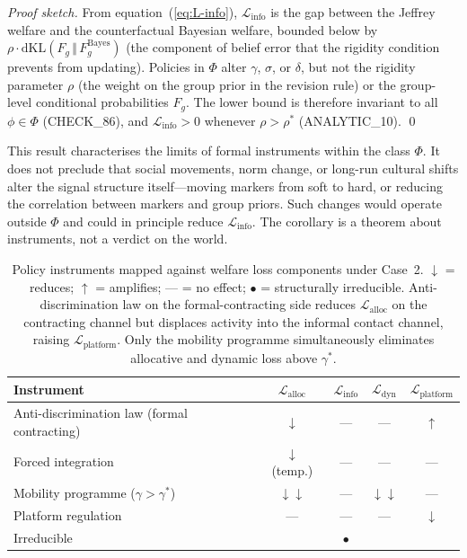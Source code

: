 \documentclass[12pt,a4paper]{article}
\theoremstyle{definition}
\numberwithin{proposition}{section}
\begin{document}
\begin{proof}[Proof sketch]
From equation~(\ref{eq:L-info}), $\mathcal{L}_{\text{info}}$ is the
gap between the Jeffrey welfare and the counterfactual Bayesian
welfare, bounded below by
$\rho \cdot \mathrm{dKL}(F_g \,\Vert\, F_g^{\mathrm{Bayes}})$ (the
component of belief error that the rigidity condition prevents
from updating). Policies in $\Phi$ alter $\gamma$, $\sigma$, or
$\delta$, but not the rigidity parameter $\rho$ (the weight on the
group prior in the revision rule) or the group-level conditional
probabilities $F_g$. The lower bound is therefore invariant to all
$\phi \in \Phi$ (CHECK\_86), and $\mathcal{L}_{\text{info}} > 0$
whenever $\rho > \rho^*$ (ANALYTIC\_10).
\qed
\end{proof}

This result characterises the limits of formal instruments within
the class $\Phi$. It does not preclude that social movements, norm
change, or long-run cultural shifts alter the signal structure
itself---moving markers from soft to hard, or reducing the
correlation between markers and group priors. Such changes would
operate outside $\Phi$ and could in principle reduce
$\mathcal{L}_{\text{info}}$. The corollary is a theorem about
instruments, not a verdict on the world.

\begin{table}[t]
\centering
\renewcommand{\arraystretch}{1.4}
\small
\begin{tabular}{lcccc}
\toprule
\textbf{Instrument} &
$\mathcal{L}_{\text{alloc}}$ &
$\mathcal{L}_{\text{info}}$ &
$\mathcal{L}_{\text{dyn}}$ &
$\mathcal{L}_{\text{platform}}$ \\
\midrule
Anti-discrimination law (formal contracting)
                          & $\downarrow$ & --- & --- & $\uparrow$ \\
Forced integration        & $\downarrow$ (temp.) & --- & --- & --- \\
Mobility programme ($\gamma > \gamma^*$) & $\downarrow\downarrow$ & --- & $\downarrow\downarrow$ & --- \\
Platform regulation       & --- & --- & --- & $\downarrow$ \\
\midrule
Irreducible               & & $\bullet$ & & \\
\bottomrule
\end{tabular}
\caption{Policy instruments mapped against welfare loss components
under Case~2. $\downarrow$ = reduces; $\uparrow$ = amplifies;
--- = no effect; $\bullet$ = structurally irreducible.
Anti-discrimination law on the formal-contracting side reduces
$\mathcal{L}_{\text{alloc}}$ on the contracting channel but
displaces activity into the informal contact channel, raising
$\mathcal{L}_{\text{platform}}$. Only the mobility programme
simultaneously eliminates allocative and dynamic loss above
$\gamma^*$.}
\label{tab:welfare-addendum}
\end{table}
\end{document}
